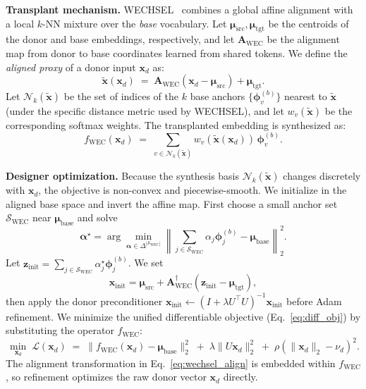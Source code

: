 \noindent\textbf{Transplant mechanism.}
WECHSEL~\citep{minixhofer2021wechsel} combines a global affine alignment with a local $k$-NN mixture over the \emph{base} vocabulary.
Let $\boldsymbol{\mu}_{\text{src}}, \boldsymbol{\mu}_{\text{tgt}}$ be the centroids of the donor and base embeddings, respectively, and let $\mathbf{A}_{\mathrm{WEC}}$ be the alignment map from donor to base coordinates learned from shared tokens.
We define the \emph{aligned proxy} of a donor input $\mathbf{x}_d$ as:
\begin{equation}
\label{eq:wechsel_align}
\tilde{\mathbf{x}}(\mathbf{x}_d) \;=\; \mathbf{A}_{\mathrm{WEC}}(\mathbf{x}_d - \boldsymbol{\mu}_{\text{src}}) + \boldsymbol{\mu}_{\text{tgt}}.
\end{equation}
Let $\mathcal{N}_k(\tilde{\mathbf{x}})$ be the set of indices of the $k$ base anchors $\{\boldsymbol{\phi}^{(b)}_v\}$ nearest to $\tilde{\mathbf{x}}$ (under the specific distance metric used by WECHSEL), and let $w_v(\tilde{\mathbf{x}})$ be the corresponding softmax weights.
The transplanted embedding is synthesized as:
\begin{equation}
\label{eq:wechsel_func}
f_{\text{WEC}}(\mathbf{x}_d)
\;=\;
\sum_{v\in\mathcal{N}_k(\tilde{\mathbf{x}})} w_v(\tilde{\mathbf{x}}(\mathbf{x}_d))\,\boldsymbol{\phi}^{(b)}_v.
\end{equation}

\noindent\textbf{Designer optimization.}
Because the synthesis basis $\mathcal{N}_k(\tilde{\mathbf{x}})$ changes discretely with $\mathbf{x}_d$, the objective is non-convex and piecewise-smooth.
We initialize in the aligned base space and invert the affine map. First choose a small anchor set $\mathcal{S}_{\mathrm{WEC}}$ near $\boldsymbol{\mu}_{\text{base}}$ and solve
\[
\boldsymbol{\alpha}^\star
=
\arg\min_{\boldsymbol{\alpha}\in\Delta^{|\mathcal{S}_{\mathrm{WEC}}|}}
\left\|\sum_{j\in\mathcal{S}_{\mathrm{WEC}}}\alpha_j\boldsymbol{\phi}^{(b)}_j-\boldsymbol{\mu}_{\text{base}}\right\|_2^2.
\]
Let $\mathbf{z}_{\text{init}}=\sum_{j\in\mathcal{S}_{\mathrm{WEC}}}\alpha_j^\star\boldsymbol{\phi}^{(b)}_j$. We set
\[
\mathbf{x}_{\text{init}}
=
\boldsymbol{\mu}_{\text{src}}+\mathbf{A}_{\mathrm{WEC}}^\dagger(\mathbf{z}_{\text{init}}-\boldsymbol{\mu}_{\text{tgt}}),
\]
then apply the donor preconditioner $\mathbf{x}_{\text{init}}\leftarrow(I+\lambda U^\top U)^{-1}\mathbf{x}_{\text{init}}$ before Adam refinement.
We minimize the unified differentiable objective (Eq.~\ref{eq:diff_obj}) by substituting the operator $f_{\text{WEC}}$:
\begin{equation}
\label{eq:wechsel_obj}
\min_{\mathbf{x}_d} \; \mathcal{L}(\mathbf{x}_d)
\;=\;
 \big\|f_{\text{WEC}}(\mathbf{x}_d) - \boldsymbol{\mu}_{\text{base}}\big\|_2^2
\;+\;
\lambda \|U \mathbf{x}_d\|_2^2
\;+\;
\rho(\|\mathbf{x}_d\|_2-\nu_d)^2.
\end{equation}
The alignment transformation in Eq.~\ref{eq:wechsel_align} is embedded within $f_{\text{WEC}}$, so refinement optimizes the raw donor vector $\mathbf{x}_d$ directly.

